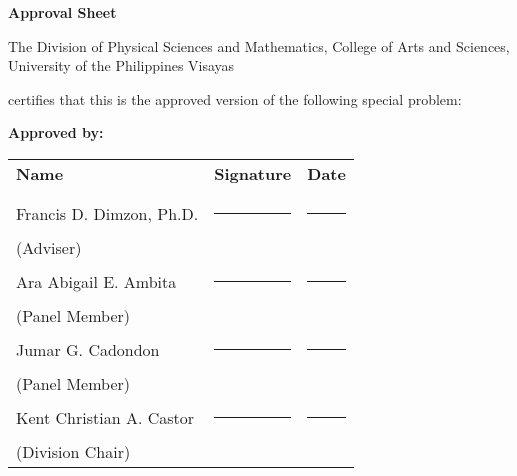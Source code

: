 \begin{center}
	\textbf{Approval Sheet}
	
	The Division of Physical Sciences and Mathematics, College of Arts and Sciences, University of the Philippines Visayas 
	
	certifies that this is the approved version of the following special problem:
	
\end{center}

{\small\textbf{Approved by:}}

\newcommand{\signaturerule}{\rule{10em}{.4pt}}
\begin{tabular}{lll}
	\bfseries Name  & \bfseries Signature & \bfseries Date\\ \\
	Francis D. Dimzon, Ph.D. &\signaturerule  & \signaturerule\\ 
	\multicolumn{1}{l}{(Adviser)} \\ 
	Ara Abigail E. Ambita &\signaturerule &\signaturerule\\
	\multicolumn{1}{l}{(Panel Member)}  \\
	Jumar G. Cadondon &\signaturerule &\signaturerule\\
	\multicolumn{1}{l}{(Panel Member)}  \\
	Kent Christian A. Castor &\signaturerule &\signaturerule\\
	\multicolumn{1}{l}{(Division Chair)}
	
\end{tabular}
